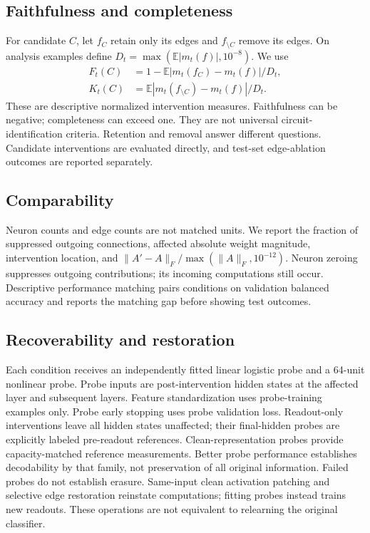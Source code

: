 \documentclass[11pt]{article}
\begin{document}
\subsection{Faithfulness and completeness}
For candidate $C$, let $f_C$ retain only its edges and $f_{\setminus C}$ remove its edges. On analysis examples define $D_t=\max(\mathbb E|m_t(f)|,10^{-8})$. We use
\begin{align}
F_t(C)&=1-\mathbb E|m_t(f_C)-m_t(f)|/D_t,\\
K_t(C)&=\mathbb E|m_t(f_{\setminus C})-m_t(f)|/D_t.
\end{align}
These are descriptive normalized intervention measures. Faithfulness can be negative; completeness can exceed one. They are not universal circuit-identification criteria. Retention and removal answer different questions. Candidate interventions are evaluated directly, and test-set edge-ablation outcomes are reported separately.
\subsection{Comparability}
Neuron counts and edge counts are not matched units. We report the fraction of suppressed outgoing connections, affected absolute weight magnitude, intervention location, and $\|A'-A\|_F/\max(\|A\|_F,10^{-12})$. Neuron zeroing suppresses outgoing contributions; its incoming computations still occur. Descriptive performance matching pairs conditions on validation balanced accuracy and reports the matching gap before showing test outcomes.
\subsection{Recoverability and restoration}
Each condition receives an independently fitted linear logistic probe and a 64-unit nonlinear probe. Probe inputs are post-intervention hidden states at the affected layer and subsequent layers. Feature standardization uses probe-training examples only. Probe early stopping uses probe validation loss. Readout-only interventions leave all hidden states unaffected; their final-hidden probes are explicitly labeled pre-readout references. Clean-representation probes provide capacity-matched reference measurements. Better probe performance establishes decodability by that family, not preservation of all original information. Failed probes do not establish erasure. Same-input clean activation patching and selective edge restoration reinstate computations; fitting probes instead trains new readouts. These operations are not equivalent to relearning the original classifier.
\end{document}
